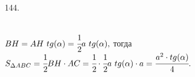 144. \begin{figure}[ht!]
\end{figure}\\
$BH=AH\ tg(\alpha)=\cfrac{1}{2}a\ tg(\alpha),$ тогда $S_{\Delta ABC}=\cfrac{1}{2}BH\cdot AC=\cfrac{1}{2}\cdot \cfrac{1}{2}a\ tg(\alpha)\cdot a=\cfrac{a^2\cdot tg(\alpha)}{4}.$\\
